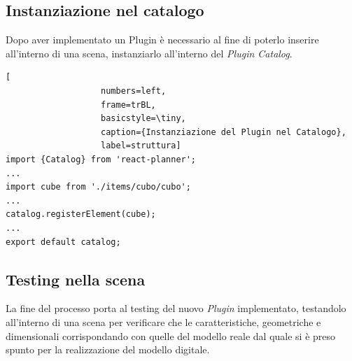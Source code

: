 \subsection{Instanziazione nel catalogo}
Dopo aver implementato un Plugin è necessario al fine di poterlo inserire all'interno di una scena, instanziarlo
all'interno del \emph{Plugin Catalog}.\\
\begin{lstlisting}[
                   numbers=left,
                   frame=trBL,
                   basicstyle=\tiny,
                   caption={Instanziazione del Plugin nel Catalogo},
                   label=struttura]
import {Catalog} from 'react-planner';
...
import cube from './items/cubo/cubo';
...
catalog.registerElement(cube);
...
export default catalog;
\end{lstlisting}

\subsection{Testing nella scena}
La fine del processo porta al testing del nuovo \emph{Plugin} implementato, testandolo all'interno
di una scena per verificare che le caratteristiche, geometriche e dimensionali corrispondando con quelle
del modello reale dal quale si è preso spunto per la realizzazione del modello digitale.\\

